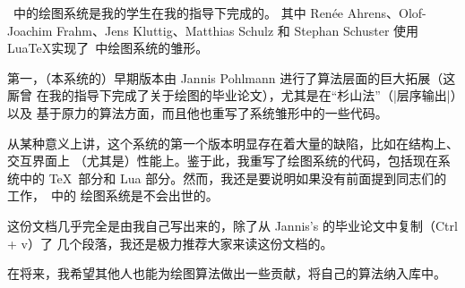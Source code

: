\tikzname\ 中的绘图系统是我的学生在我的指导下完成的。
其中 Ren\'ee Ahrens、Olof-Joachim Frahm、Jens Kluttig、Matthias Schulz 
和 Stephan Schuster 使用Lua\TeX 实现了\tikzname\ 中绘图系统的雏形。

第一，（本系统的）早期版本由 Jannis Pohlmann 进行了算法层面的巨大拓展（这厮曾
在我的指导下完成了关于绘图的毕业论文），尤其是在“杉山法”（|层序输出|）以及
基于原力的算法方面，而且他也重写了系统雏形中的一些代码。

从某种意义上讲，这个系统的第一个版本明显存在着大量的缺陷，比如在结构上、交互界面上
（尤其是）性能上。鉴于此，我重写了绘图系统的代码，包括现在系统中的 \TeX\ 部分和 Lua
部分。然而，我还是要说明如果没有前面提到同志们的工作，\tikzname\ 中的
绘图系统是不会出世的。

这份文档几乎完全是由我自己写出来的，除了从 Jannis's 的毕业论文中复制（Ctrl + v）了
几个段落，我还是极力推荐大家来读这份文档的。

在将来，我希望其他人也能为绘图算法做出一些贡献，将自己的算法纳入库中。